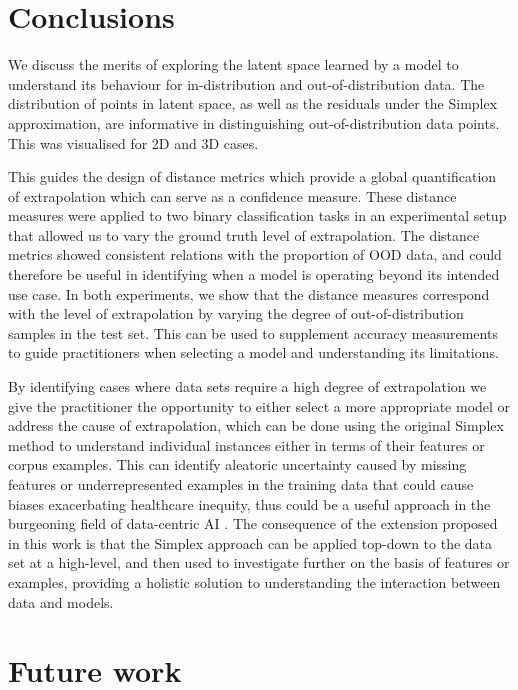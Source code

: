 \documentclass{article}
\begin{document}
\section{Conclusions}

We discuss the merits of exploring the latent space learned by a model to understand its behaviour for in-distribution and out-of-distribution data. The distribution of points in latent space, as well as the residuals under the Simplex approximation, are informative in distinguishing out-of-distribution data points. This was visualised for 2D and 3D cases.

This guides the design of distance metrics which provide a global quantification of extrapolation which can serve as a confidence measure. These distance measures were applied to two binary classification tasks in an experimental setup that allowed us to vary the ground truth level of extrapolation. The distance metrics showed consistent relations with the proportion of OOD data, and could therefore be useful in identifying when a model is operating beyond its intended use case.
In both experiments, we show that the distance measures correspond with the level of extrapolation by varying the degree of out-of-distribution samples in the test set.
This can be used to supplement accuracy measurements to guide practitioners when selecting a model and understanding its limitations.

By identifying cases where data sets require a high degree of extrapolation we give the practitioner the opportunity to either select a more appropriate model or address the cause of extrapolation, which can be done using the original Simplex method to understand individual instances either in terms of their features or corpus examples. This can identify aleatoric uncertainty caused by missing features or underrepresented examples in the training data that could cause biases exacerbating healthcare inequity, thus could be a useful approach in the burgeoning field of data-centric AI \cite{zha_data-centric_2023}.
The consequence of the extension proposed in this work is that the Simplex approach can be applied top-down to the data set at a high-level, and then used to investigate further on the basis of features or examples, providing a holistic solution to understanding the interaction between data and models.



\section{Future work}
\label{sec:future work}
\end{document}
